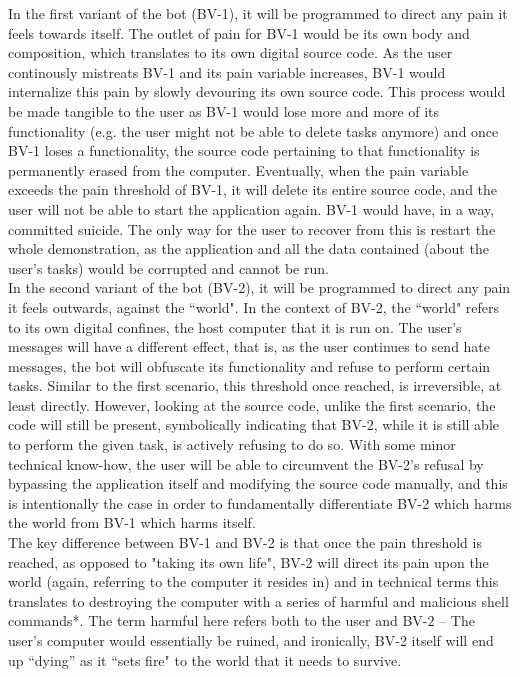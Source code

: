 \documentclass[11pt]{article}
\begin{document}
In the first variant of the bot (BV-1), it will be programmed to direct any pain it feels towards itself. The outlet of pain for BV-1 would be its own body and composition, which translates to its own digital source code. As the user continously mistreats BV-1 and its pain variable increases, BV-1 would internalize this pain by slowly devouring its own source code. This process would be made tangible to the user as BV-1 would lose more and more of its functionality (e.g. the user might not be able to delete tasks anymore) and once BV-1 loses a functionality, the source code pertaining to that functionality is permanently erased from the computer. Eventually, when the pain variable exceeds the pain threshold of BV-1, it will delete its entire source code, and the user will not be able to start the application again. BV-1 would have, in a way, committed suicide. The only way for the user to recover from this is restart the whole demonstration, as the application and all the data contained (about the user's tasks) would be corrupted and cannot be run. \\

In the second variant of the bot (BV-2), it will be programmed to direct any pain it feels outwards, against the ``world". In the context of BV-2, the ``world" refers to its own digital confines, the host computer that it is run on. The user’s messages will have a different effect, that is, as the user continues to send hate messages, the bot will obfuscate its functionality and refuse to perform certain tasks. Similar to the first scenario, this threshold once reached, is irreversible, at least directly. However, looking at the source code, unlike the first scenario, the code will still be present, symbolically indicating that BV-2, while it is still able to perform the given task, is actively refusing to do so. With some minor technical know-how, the user will be able to circumvent the BV-2’s refusal by bypassing the application itself and modifying the source code manually, and this is intentionally the case in order to fundamentally differentiate BV-2 which harms the world from BV-1 which harms itself. \\

The key difference between BV-1 and BV-2 is that once the pain threshold is reached, as opposed to "taking its own life", BV-2 will direct its pain upon the world (again, referring to the computer it resides in) and in technical terms this translates to destroying the computer with a series of harmful and malicious shell commands*. The term harmful here refers both to the user and BV-2 – The user's computer would essentially be ruined, and ironically, BV-2 itself will end up “dying” as it ``sets fire" to the world that it needs to survive. \\
\end{document}
